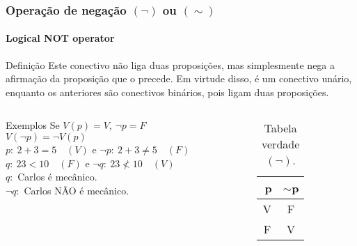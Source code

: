 \begin{frame}[t]
    \frametitle{Operação de negação $(\lnot)$ ou $(\sim)$}
    \framesubtitle{Logical NOT operator}
    \begin{block}{Definição}
        Este conectivo não liga duas proposições, mas simplesmente nega a afirmação da proposição que o precede. Em virtude disso, é um conectivo unário, enquanto os anteriores são conectivos binários, pois ligam duas proposições.
    \end{block}
    \vspace{-4mm}
    \begin{columns}[t]
        \begin{column}{0.55\textwidth}
            \small
            \begin{exampleblock}{Exemplos}
                Se $V(p) = V$, $\lnot p = F$ \\ [2pt]
                $V(\lnot p) = \lnot V(p)$ \\ [2pt]
                $p:~2+3=5\quad (V)$ e $\lnot p:~2+3 \neq 5\quad (F)$ \\ [2pt]
                $q:~23 < 10 \quad (F)$ e $\lnot q:~23 \nless 10 \quad (V)$ \\[2pt]
                $q:$ Carlos é mecânico. \\[2pt]
                $\lnot q:$ Carlos NÃO é mecânico.
            \end{exampleblock}
        \end{column}
        \hspace{-5mm}
        \begin{column}{0.4\textwidth}
            \vspace{-3mm}
            \begin{table}[t]
                \caption{Tabela verdade $(\lnot)$.}
                \label{tab:tabela-not}
                \begin{tabular}{|c|c|}
                \hline
                \rowcolor[HTML]{EFEFEF} 
                \textbf{$~$p} & \textbf{$\sim$p} \\ \hline
                V          & F                \\ \hline
                F          & V                \\ \hline
                \end{tabular}
            \end{table}
        \end{column}
    \end{columns}
\end{frame}
%

